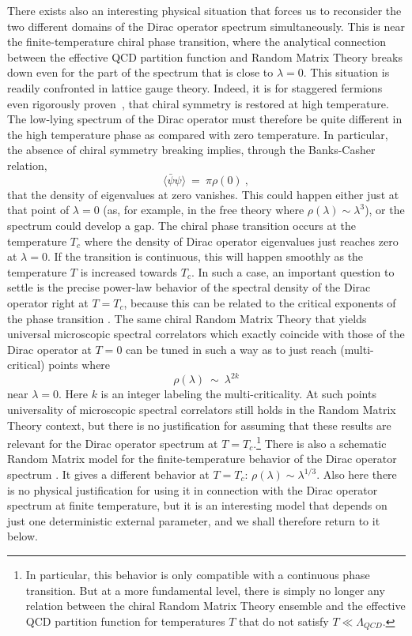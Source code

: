 \documentclass[11pt]{article}
\newcommand{\beq}{\begin{equation}}
\newcommand{\eeq}{\end{equation}}
\newcommand{\noi}{\vspace{12pt}\noindent}
\begin{document}
\noi
There exists also an interesting physical situation that forces us to
reconsider the two different domains of the Dirac operator spectrum
simultaneously. This is near the finite-temperature chiral phase transition,
where the analytical connection between the effective QCD partition function
and Random Matrix Theory breaks down even for the part of the spectrum
that is close to $\lambda=0$. This situation is readily confronted in
lattice gauge theory. Indeed, it is for staggered fermions even rigorously
proven~\cite{Tomboulis}, that chiral symmetry is restored at high
temperature. The low-lying spectrum of the Dirac operator must therefore
be quite different in the high temperature phase as compared with zero
temperature. In particular, the absence of chiral symmetry breaking
implies, through the Banks-Casher relation,
\begin{equation}
 \langle \bar\psi \psi \rangle ~=~ \pi \rho(0) ~,
\label{eq:Banks}
\end{equation}
that the density of eigenvalues at zero vanishes. This could happen either
just at that point of $\lambda=0$ (as, for example, in the free theory
where $\rho(\lambda) \sim \lambda^3$), or the spectrum could develop a gap.
The chiral phase transition occurs at the temperature $T_c$ where the
density of Dirac operator eigenvalues just reaches zero at $\lambda=0$.
If the transition is continuous, this will happen smoothly as the temperature
$T$ is increased towards $T_c$. In such a case, an important question
to settle is the precise power-law behavior of the spectral density of the 
Dirac operator right at $T=T_c$, 
because this can be related to the critical exponents
of the phase transition \cite{Z}. 
The same chiral Random Matrix Theory
that yields universal microscopic spectral correlators which exactly
coincide with those of the Dirac operator at $T=0$ can be tuned
in such a way as to just reach (multi-critical) points where \cite{ADMN2} 
\beq
\rho(\lambda) ~\sim~ \lambda^{2k}
\eeq
near $\lambda = 0$. Here $k$ is an integer labeling the multi-criticality.
At such points universality of microscopic spectral correlators still 
holds in the Random Matrix Theory
context, but there is no justification for assuming that these results
are relevant for the Dirac operator spectrum at $T=T_c$.\footnote{In 
particular, this behavior is only compatible with a continuous phase
transition. But at a more fundamental level, there is simply no longer
any relation between the chiral Random Matrix Theory ensemble and the
effective QCD partition function for temperatures $T$ that do not satisfy
$T \ll \Lambda_{QCD}$.} There is also
a schematic Random Matrix model for the finite-temperature behavior of
the Dirac operator spectrum \cite{JV}. It gives a different behavior
at $T=T_c$: $\rho(\lambda) \sim \lambda^{1/3}$. Also here there is no
physical
justification for using it in connection with the Dirac operator
spectrum at finite temperature, but it is an interesting model
that depends on just one deterministic external parameter, and we shall
therefore return to it below.
\end{document}

